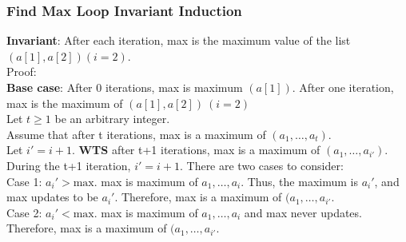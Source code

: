 \documentclass{article}
\begin{document}
\begin{spacing}{1.5}
 \subsubsection{Find Max Loop Invariant Induction}
 \textbf{Invariant}: After each iteration, max is the maximum value of the list $(a[1], a[2])(i=2)$.\\
 Proof:\\
 \textbf{Base case}: After 0 iterations, max is maximum $(a[1])$. After one iteration, max is the maximum of $(a[1], a[2]) \ (i=2)$\\
 Let $t \geq 1$ be an arbitrary integer.\\
 Assume that after t iterations, max is a maximum of $(a_1,\dots, a_t)$.\\
 Let $i'=i+1$. \textbf{WTS} after t+1 iterations, max is a maximum of $(a_1,\dots, a_{i'})$.\\
 During the t+1 iteration, $i'=i+1$. There are two cases to consider:\\
Case 1: $a_i' > \text{max}$. max is maximum of $a_1,\dots,a_i$. Thus, the maximum is $a_i'$, and max updates to be $a_i'$. Therefore, max is a maximum of $(a_1,\dots, a_{i'}$.\\
Case 2: $a_i' < \text{max}$. max is maximum of $a_1,\dots,a_i$ and max never updates. Therefore, max is a maximum of $(a_1,\dots, a_{i'}$.\\
 
 \label{sec:findmaxproof}
\end{spacing}
\end{document}
